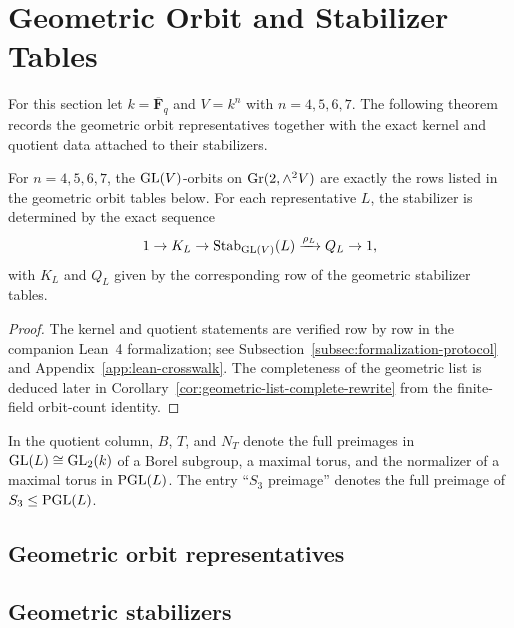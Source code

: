 \section{Geometric Orbit and Stabilizer Tables}
\label{sec:geometric-stabilizers}

For this section let \(k=\overline{\mathbf F}_q\) and \(V=k^n\) with
\(n=4,5,6,7\). The following theorem records the geometric orbit
representatives together with the exact kernel and quotient data attached to
their stabilizers.

\begin{theorem}
\label{thm:geometric-tables}
For \(n=4,5,6,7\), the \(\mathrm{GL}(V)\)-orbits on \(\mathrm{Gr}(2,\wedge^2 V)\) are exactly
the rows listed in the geometric orbit tables below. For each representative
\(L\), the stabilizer is determined by the exact sequence
\[
  1\to K_L\to \mathrm{Stab}_{\mathrm{GL}(V)}(L)\xrightarrow{\rho_L} Q_L\to 1,
\]
with \(K_L\) and \(Q_L\) given by the corresponding row of the geometric
stabilizer tables.
\end{theorem}

\begin{proof}
The kernel and quotient statements are verified row by row in the companion
Lean~4 formalization; see Subsection~\ref{subsec:formalization-protocol} and
Appendix~\ref{app:lean-crosswalk}. The completeness of the geometric list is
deduced later in Corollary~\ref{cor:geometric-list-complete-rewrite} from the
finite-field orbit-count identity.
\end{proof}

In the quotient column, \(B\), \(T\), and \(N_T\) denote the full preimages in
\(\mathrm{GL}(L)\cong \mathrm{GL}_2(k)\) of a Borel subgroup, a maximal torus, and the
normalizer of a maximal torus in \(\mathrm{PGL}(L)\). The entry ``\(S_3\) preimage''
denotes the full preimage of \(S_3\le \mathrm{PGL}(L)\).

\subsection{Geometric orbit representatives}

\begingroup
\small

\endgroup

\subsection{Geometric stabilizers}

\begingroup
\small

\endgroup


